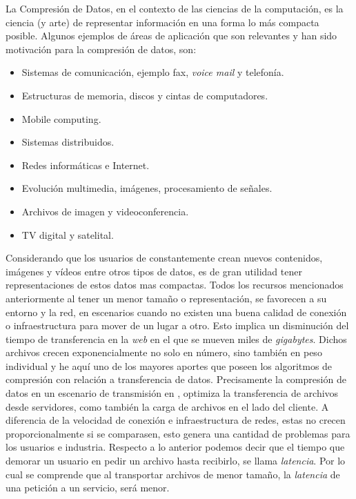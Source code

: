 
 
La Compresión de Datos, en el contexto de las ciencias de la computación, es la ciencia (y arte) de representar información en una forma lo más compacta posible. Algunos ejemplos de áreas de aplicación que son relevantes y han sido motivación para la compresión de datos, son:

\begin{itemize}
	\menorEspacioItemize

	\item Sistemas de comunicación, ejemplo fax, \emph{voice mail} y telefonía.
	\item Estructuras de memoria, discos y cintas de computadores.
	\item Mobile computing.
	\item Sistemas distribuidos.
	\item Redes informáticas e Internet.
	\item Evolución multimedia, imágenes, procesamiento de señales.
	\item Archivos de imagen y videoconferencia.
	\item TV digital y satelital.

\end{itemize}


Considerando que los usuarios de \inet constantemente  crean nuevos contenidos, imágenes y vídeos  entre otros tipos de datos, es de gran utilidad tener representaciones de estos datos mas compactas. Todos los recursos mencionados anteriormente al tener un menor tamaño o representación, se favorecen a su entorno y la red, en escenarios cuando no existen una buena calidad de conexión o infraestructura para mover de un lugar a otro. Esto implica un disminución del tiempo de transferencia en la \emph{web} en el que se mueven miles de \emph{gigabytes}. Dichos archivos crecen exponencialmente no solo en número, sino también en peso individual y he aquí uno de los mayores aportes que poseen los algoritmos de compresión con relación a transferencia de datos. Precisamente la compresión de datos en un escenario de transmisión en \inet, optimiza la transferencia de archivos desde servidores, como también la carga de archivos en el lado del cliente. A diferencia de la velocidad de conexión e infraestructura de redes, estas no crecen proporcionalmente si se comparasen, esto genera una cantidad de problemas para los usuarios e industria. Respecto a lo anterior podemos decir que el tiempo que demorar un usuario en pedir un archivo hasta recibirlo, se llama \emph{latencia}. Por lo cual se comprende que al transportar archivos de menor tamaño, la \emph{latencia} de una petición a un servicio, será menor.


